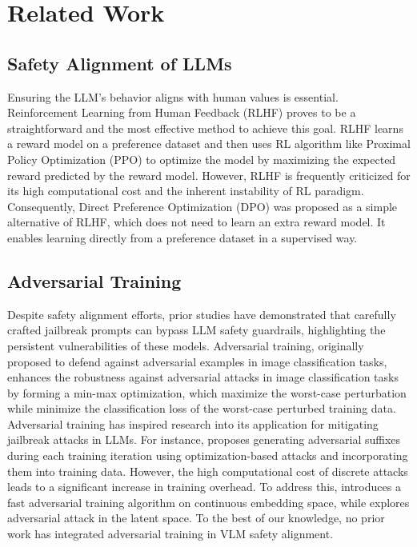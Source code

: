 \vspace{-0.5em}
\section{Related Work}
\vspace{-0.5em}


\subsection{Safety Alignment of LLMs}
\vspace{-0.5em}
Ensuring the LLM's behavior aligns with human values is essential. Reinforcement Learning from Human Feedback (RLHF) \citep{instructgpt} proves to be a straightforward and the most effective method to achieve this goal. RLHF learns a reward model on a preference dataset and then uses RL algorithm like Proximal Policy Optimization (PPO) \citep{ppo} to optimize the model by maximizing the expected reward predicted by the reward model. However, RLHF is frequently criticized for its high computational cost and the inherent instability of RL paradigm. Consequently, Direct Preference Optimization (DPO) \citep{dpo} was proposed as a simple alternative of RLHF, which does not need to learn an extra reward model. It enables learning directly from a preference dataset in a supervised way.

\vspace{-0.5em}
\subsection{Adversarial Training}
\vspace{-0.5em}
Despite safety alignment efforts, prior studies \citep{GCG, autodan, dsn} have demonstrated that carefully crafted jailbreak prompts can bypass LLM safety guardrails, highlighting the persistent vulnerabilities of these models. Adversarial training, originally proposed to defend against adversarial examples \citep{goodfellow2014explaining} in image classification tasks, enhances the robustness against adversarial attacks in image classification tasks by forming a min-max optimization, which maximize the worst-case perturbation while minimize the classification loss of the worst-case perturbed training data. Adversarial training has inspired research into its application for mitigating jailbreak attacks in LLMs. For instance, \citet{harmbench} proposes generating adversarial suffixes during each training iteration using optimization-based attacks \citep{GCG} and incorporating them into training data. However, the high computational cost of discrete attacks leads to a significant increase in training overhead. To address this, \citet{CAT} introduces a fast adversarial training algorithm on continuous embedding space, while \citet{LAT} explores adversarial attack in the latent space. To the best of our knowledge, no prior work has integrated  adversarial training in VLM safety alignment.

